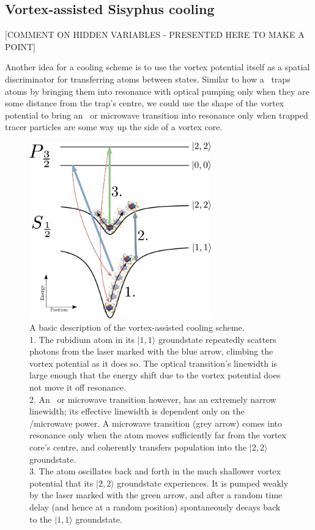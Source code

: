 \subsection{Vortex-assisted Sisyphus cooling}\label{sec:vortexcooling}

[COMMENT ON HIDDEN VARIABLES - PRESENTED HERE TO MAKE A POINT]

Another idea for a cooling scheme is to use the vortex potential itself as a spatial discriminator for transferring atoms between states. Similar to how a \mot\ traps atoms by bringing them into resonance with optical pumping only when they are some distance from the trap's centre, we could use the shape of the vortex potential to bring an \rf\ or microwave transition into resonance only when trapped tracer particles are some way up the side of a vortex core.

\begin{figure}
\begin{center}
\includegraphics[width=0.7\textwidth]{figures/unsorted/vortexcooling.pdf}
\caption{A basic description of the vortex-assisted cooling scheme.
\protect\\
1. The rubidium atom in its $|1,1\rangle$ groundstate repeatedly scatters photons from the laser marked with the blue arrow, climbing the vortex potential as it does so. The optical transition's linewidth is large enough that the energy shift due to the vortex potential does not move it off resonance.
\protect\\
 2. An \rf\ or microwave transition however, has an extremely narrow linewidth; its effective linewidth is dependent only on the \rf/microwave power. A microwave transition (grey arrow) comes into resonance only when the atom moves sufficiently far from the vortex core's centre, and coherently transfers population into the $|2,2\rangle$ groundstate.
 \protect\\
 3. The atom oscillates back and forth in the much shallower vortex potential that its $|2,2\rangle$ groundstate experiences. It is pumped weakly by the laser marked with the green arrow, and after a random time delay (and hence at a random position) spontaneously decays back to the $|1,1\rangle$ groundstate.
}\label{fig:vortexcooling}
\end{center}
\end{figure}

